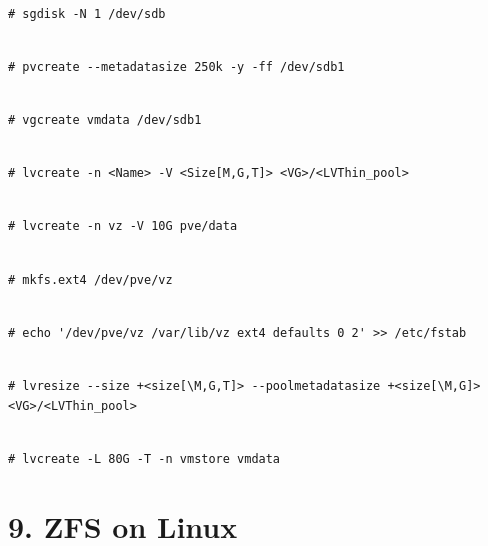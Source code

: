 \begin{lstlisting}

# sgdisk -N 1 /dev/sdb

\end{lstlisting}

\begin{lstlisting}

# pvcreate --metadatasize 250k -y -ff /dev/sdb1

\end{lstlisting}

\begin{lstlisting}

# vgcreate vmdata /dev/sdb1

\end{lstlisting}

\begin{lstlisting}

# lvcreate -n <Name> -V <Size[M,G,T]> <VG>/<LVThin_pool>

\end{lstlisting}

\begin{lstlisting}

# lvcreate -n vz -V 10G pve/data

\end{lstlisting}

\begin{lstlisting}

# mkfs.ext4 /dev/pve/vz

\end{lstlisting}

\begin{lstlisting}

# echo '/dev/pve/vz /var/lib/vz ext4 defaults 0 2' >> /etc/fstab

\end{lstlisting}

\begin{lstlisting}

# lvresize --size +<size[\M,G,T]> --poolmetadatasize +<size[\M,G]> <VG>/<LVThin_pool>

\end{lstlisting}

\begin{lstlisting}

# lvcreate -L 80G -T -n vmstore vmdata

\end{lstlisting}


\section{9. ZFS on Linux}

